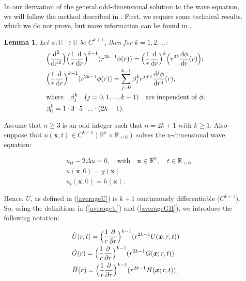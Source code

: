 \documentclass[a4paper, 12pt]{article}
\numberwithin{equation}{section}
\begin{document}
In our derivation of the general odd-dimensional solution to the wave equation,
we will follow the method described in \cite[Ch. 2.4.1.d]{Ev}. First, we require some
technical results, which we do not prove, but more information can be found in
\cite[Ch. 2.4.1.d, Lemma 2]{Ev}. 


\newtheorem{lemma}{Lemma}
\begin{lemma} \label{lemma}
    Let $\phi:\mathbb{R} \to \mathbb{R}$ be $C^{k+1}$, then for $k=1, 2, ...$:
    \begin{align}
        &\Big(\diff[2]{}{r}\Big)\Big( \frac{1}{r} \diff{}{r}\Big)^{k-1}(r^{2k-1}\phi(r))=\Big( \frac{1}{r} \diff{}{r}\Big)^k \Big(r^{2k} \diff{\phi}{r}(r) \Big); \label{i}\\
        &\Big( \frac{1}{r} \diff{}{r}\Big)^{k-1}(r^{2k-1}\phi(r))=\sum^{k-1}_{j=0} \beta_{j}^{k} r^{j+1} \diff[j]{\phi}{r}(r), \label{ii} \\
        &\textrm{where} \quad \beta_{j}^{k} \quad (j=0,1,...,k-1) \quad \textrm{are inependent of $\phi$}; \nonumber \\
        &\beta_{0}^{k}=1 \cdot 3 \cdot 5 \cdot ... \cdot (2k-1). \label{iii}
    \end{align}
\end{lemma}

Assume that $n \ge 3$ is an odd integer such that $n=2k+1$ with $k \ge 1$. Also
suppose that $u(\boldsymbol{x},t) \in C^{k+1}(\mathbb{R}^n \times \mathbb{R}_{>0})$
solves the n-dimensional wave equation:

\begin{equation} \label{ndimeq}
    \begin{aligned}
        &u_{tt}-2\Delta u =0, \quad \textrm{with} \quad \boldsymbol{x} \in \mathbb{R}^n, \quad t \in \mathbb{R}_{>0}\\
        &u(\boldsymbol{x}, 0)=g(\boldsymbol{x})\\
        &u_t(\boldsymbol{x},0)=h(\boldsymbol{x}).
    \end{aligned}
\end{equation} 

Hence, $U$, as defined in (\ref{averageU}) is $k+1$ continuously differentiable
($C^{k+1}$). So, using the definitions in (\ref{averageU}) and
(\ref{averageGH}), we introduce the following notation:

\begin{equation} \label{ndimUGH}
    \begin{aligned}
        &\hat{U}(r,t)=\Big(\frac{1}{r} \diffp[1]{}{r} \Big)^{k-1} (r^{2k-1}U(\boldsymbol{x};r,t))\\
        &\hat{G}(r)=\Big(\frac{1}{r} \diffp[1]{}{r} \Big)^{k-1} (r^{2k-1}G(\boldsymbol{x};r,t))\\
        &\hat{H}(r)=\Big(\frac{1}{r} \diffp[1]{}{r} \Big)^{k-1} (r^{2k-1}H(\boldsymbol{x};r,t)),
    \end{aligned}
\end{equation}
\end{document}
